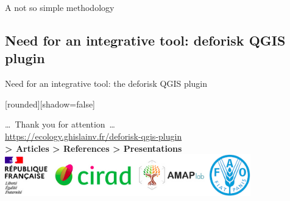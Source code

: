 \documentclass[10pt,table,dvipsnames,compress]{beamer}
\begin{document}
\begin{frame}[label={sec:org86df0e5}]{A not so simple methodology}
\end{frame}

\subsection{Need for an integrative tool: deforisk QGIS plugin}
\label{sec:org099a3ee}

\begin{frame}[label={sec:orgc26d126}]{Need for an integrative tool: the deforisk QGIS plugin}
\end{frame}


{
  [rounded][shadow=false]
  \begin{frame}[plain]
    \begin{block}{}
      \begin{center}
        \ldots~Thank you for attention~\ldots \\
        \url{https://ecology.ghislainv.fr/deforisk-qgis-plugin} \\
        \textbf{> Articles > References > Presentations} \\
        \includegraphics[width=0.8\textwidth]{figs/partners_logos}
      \end{center}
    \end{block}
  \end{frame}
}
\end{document}
